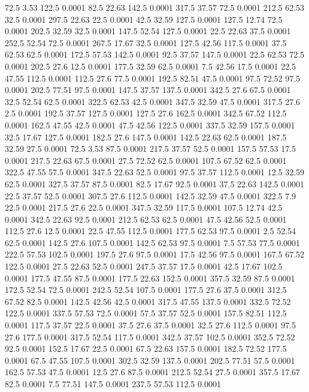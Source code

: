 72.5	3.53	122.5	0.0001
82.5	22.63	142.5	0.0001
317.5	37.57	72.5	0.0001
212.5	62.53	32.5	0.0001
297.5	22.63	22.5	0.0001
42.5	32.59	127.5	0.0001
127.5	12.74	72.5	0.0001
202.5	32.59	32.5	0.0001
147.5	52.54	127.5	0.0001
22.5	22.63	37.5	0.0001
252.5	52.54	72.5	0.0001
267.5	17.67	32.5	0.0001
127.5	42.56	117.5	0.0001
37.5	62.53	62.5	0.0001
172.5	57.53	142.5	0.0001
92.5	37.57	147.5	0.0001
22.5	62.53	72.5	0.0001
202.5	27.6	12.5	0.0001
177.5	32.59	62.5	0.0001
7.5	42.56	17.5	0.0001
22.5	47.55	112.5	0.0001
112.5	27.6	77.5	0.0001
192.5	82.51	47.5	0.0001
97.5	72.52	97.5	0.0001
202.5	77.51	97.5	0.0001
147.5	37.57	137.5	0.0001
342.5	27.6	67.5	0.0001
32.5	52.54	62.5	0.0001
322.5	62.53	42.5	0.0001
347.5	32.59	47.5	0.0001
317.5	27.6	2.5	0.0001
192.5	37.57	127.5	0.0001
127.5	27.6	162.5	0.0001
342.5	67.52	112.5	0.0001
162.5	47.55	42.5	0.0001
47.5	42.56	122.5	0.0001
337.5	32.59	157.5	0.0001
32.5	17.67	127.5	0.0001
182.5	27.6	147.5	0.0001
142.5	22.63	62.5	0.0001
187.5	32.59	27.5	0.0001
72.5	3.53	87.5	0.0001
217.5	37.57	52.5	0.0001
157.5	57.53	17.5	0.0001
217.5	22.63	67.5	0.0001
27.5	72.52	62.5	0.0001
107.5	67.52	62.5	0.0001
322.5	47.55	57.5	0.0001
347.5	22.63	52.5	0.0001
97.5	37.57	112.5	0.0001
12.5	32.59	62.5	0.0001
327.5	37.57	87.5	0.0001
82.5	17.67	92.5	0.0001
37.5	22.63	142.5	0.0001
22.5	37.57	52.5	0.0001
307.5	27.6	112.5	0.0001
142.5	32.59	47.5	0.0001
322.5	7.9	22.5	0.0001
217.5	27.6	22.5	0.0001
347.5	32.59	117.5	0.0001
107.5	12.74	42.5	0.0001
342.5	22.63	92.5	0.0001
212.5	62.53	62.5	0.0001
47.5	42.56	52.5	0.0001
112.5	27.6	12.5	0.0001
22.5	47.55	112.5	0.0001
177.5	62.53	97.5	0.0001
2.5	52.54	62.5	0.0001
142.5	27.6	107.5	0.0001
142.5	62.53	97.5	0.0001
7.5	57.53	77.5	0.0001
222.5	57.53	102.5	0.0001
197.5	27.6	97.5	0.0001
17.5	42.56	97.5	0.0001
167.5	67.52	122.5	0.0001
27.5	22.63	52.5	0.0001
247.5	37.57	17.5	0.0001
42.5	17.67	102.5	0.0001
177.5	47.55	87.5	0.0001
177.5	22.63	152.5	0.0001
357.5	32.59	87.5	0.0001
172.5	52.54	72.5	0.0001
242.5	52.54	107.5	0.0001
177.5	27.6	37.5	0.0001
312.5	67.52	82.5	0.0001
142.5	42.56	42.5	0.0001
317.5	47.55	137.5	0.0001
332.5	72.52	122.5	0.0001
337.5	57.53	72.5	0.0001
57.5	37.57	52.5	0.0001
157.5	82.51	112.5	0.0001
117.5	37.57	22.5	0.0001
37.5	27.6	37.5	0.0001
32.5	27.6	112.5	0.0001
97.5	27.6	177.5	0.0001
317.5	52.54	117.5	0.0001
342.5	37.57	102.5	0.0001
352.5	72.52	92.5	0.0001
152.5	17.67	22.5	0.0001
67.5	22.63	157.5	0.0001
182.5	72.52	177.5	0.0001
67.5	47.55	107.5	0.0001
302.5	32.59	137.5	0.0001
202.5	77.51	57.5	0.0001
162.5	57.53	47.5	0.0001
12.5	27.6	87.5	0.0001
212.5	52.54	27.5	0.0001
357.5	17.67	82.5	0.0001
7.5	77.51	147.5	0.0001
237.5	57.53	112.5	0.0001
